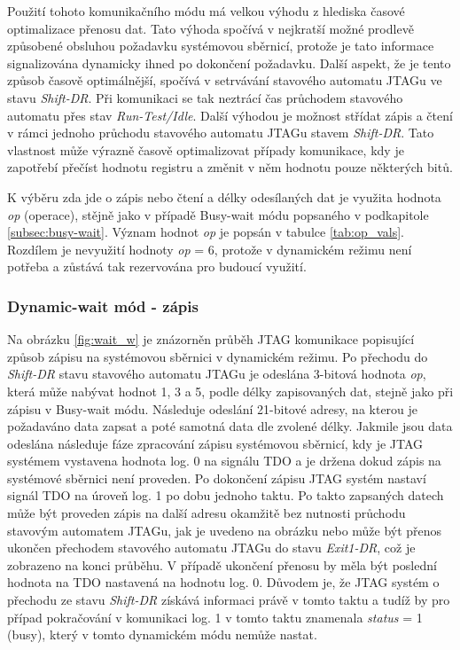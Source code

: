 Použití tohoto komunikačního módu má velkou výhodu z hlediska časové optimalizace přenosu dat. Tato výhoda spočívá v nejkratší možné prodlevě způsobené obsluhou požadavku systémovou sběrnicí, protože je tato informace signalizována dynamicky ihned po dokončení požadavku. Další aspekt, že je tento způsob časově optimálnější, spočívá v setrvávání stavového automatu JTAGu ve stavu \textit{Shift-DR}. Při komunikaci se tak neztrácí čas průchodem stavového automatu přes stav \textit{Run-Test/Idle}. Další výhodou je možnost střídat zápis a čtení v rámci jednoho průchodu stavového automatu JTAGu stavem \textit{Shift-DR}. Tato vlastnost může výrazně časově optimalizovat případy komunikace, kdy je zapotřebí přečíst hodnotu registru a změnit v něm hodnotu pouze některých bitů.

K výběru zda jde o zápis nebo čtení a délky odesílaných dat je využita hodnota \textit{op} (operace), stějně jako v případě Busy-wait módu popsaného v podkapitole \ref{subsec:busy-wait}. Význam hodnot \textit{op} je popsán v tabulce \ref{tab:op_vals}. Rozdílem je nevyužití hodnoty \textit{op} = 6, protože v dynamickém režimu není potřeba a zůstává tak rezervována pro budoucí využití.

\subsubsection{Dynamic-wait mód - zápis} 
Na obrázku \ref{fig:wait_w} je znázorněn průběh \acs{JTAG} komunikace popisující způsob zápisu na systémovou sběrnici v dynamickém  režimu. Po přechodu do \textit{Shift-DR} stavu stavového automatu JTAGu je odeslána 3-bitová hodnota \textit{op}, která může nabývat hodnot 1, 3 a 5, podle délky zapisovaných dat, stejně jako při zápisu v Busy-wait módu. Následuje odeslání 21-bitové adresy, na kterou je požadaváno data zapsat a poté samotná data dle zvolené délky. Jakmile jsou data odeslána následuje fáze zpracování zápisu systémovou sběrnicí, kdy je \acs{JTAG} systémem vystavena hodnota log. 0 na signálu \acs{TDO} a je držena dokud zápis na systémové sběrnici není proveden. Po dokončení zápisu \acs{JTAG} systém nastaví signál \acs{TDO} na úroveň log. 1 po dobu jednoho taktu. Po takto zapsaných datech může být proveden zápis na další adresu okamžitě bez nutnosti průchodu stavovým automatem JTAGu, jak je uvedeno na obrázku nebo může být přenos ukončen přechodem stavového automatu JTAGu do stavu \textit{Exit1-DR}, což je zobrazeno na konci průběhu. V případě ukončení přenosu by měla být poslední hodnota na \acs{TDO} nastavená na hodnotu log. 0. Důvodem je, že \acs{JTAG} systém o přechodu ze stavu \textit{Shift-DR} získává informaci právě v tomto taktu a tudíž by pro případ pokračování v komunikaci log. 1 v tomto taktu znamenala \textit{status} = 1 (busy), který v tomto dynamickém módu nemůže nastat.

